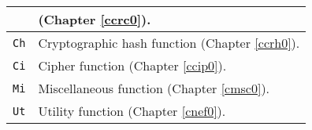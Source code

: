 \begin{table}
\begin{center}
\begin{tabular}{|l|l|}
               & (Chapter \ref{ccrc0}).                                                      \\
\hline
\texttt{Ch}    & Cryptographic hash function (Chapter \ref{ccrh0}).                          \\
\hline
\texttt{Ci}    & Cipher function (Chapter \ref{ccip0}).                                      \\
\hline
\texttt{Mi}    & Miscellaneous function (Chapter \ref{cmsc0}).                               \\
\hline
\texttt{Ut}    & Utility function (Chapter \ref{cnef0}).                                     \\
\hline
\end{tabular}
\end{center}
\end{table}

